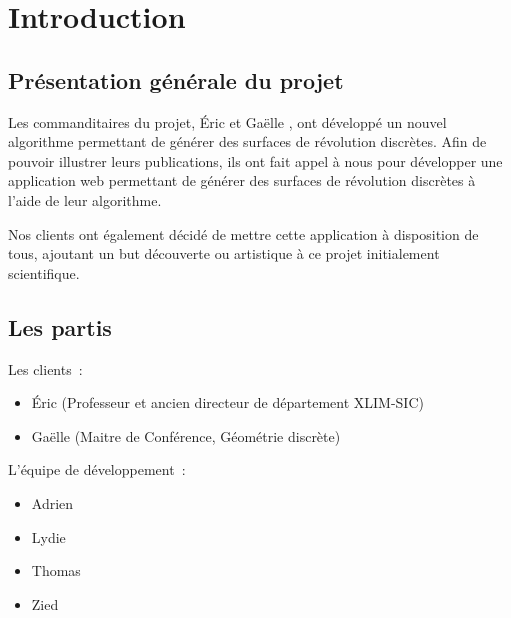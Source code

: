\documentclass{scrartcl}
\begin{document}

\section{Introduction}


	\subsection{Présentation générale du projet}
	Les commanditaires du projet, \'Eric  et Gaëlle , ont développé un nouvel algorithme permettant de générer des surfaces de révolution discrètes. Afin de pouvoir illustrer leurs publications, ils ont fait appel à nous pour développer une application web permettant de générer des surfaces de révolution discrètes à l'aide de leur algorithme.

Nos clients ont également décidé de mettre cette application à disposition de tous, ajoutant un but découverte ou artistique à ce projet initialement scientifique.

	\subsection{Les partis}
		Les clients~:
		\begin{itemize}
			\item Éric  (Professeur et ancien directeur de département XLIM-SIC)
			\item Gaëlle  (Maitre de Conférence, Géométrie discrète)
		\end{itemize}

		\bigskip %

		L'équipe de développement~:
		\begin{itemize}
			\item Adrien 
			\item Lydie 
			\item Thomas 
			\item Zied 
		\end{itemize}


\end{document}
